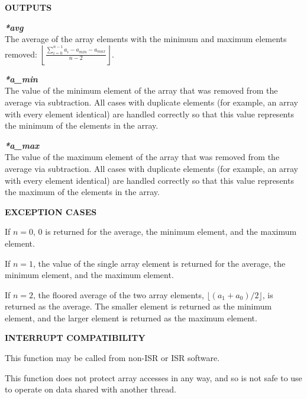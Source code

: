 \noindent\textbf{OUTPUTS}
\begin{list}{}{\setlength{\leftmargin}{0.5in}\setlength{\itemindent}{-0.25in}\setlength{\topsep}{0.0in}\setlength{\partopsep}{0.0in}}
\item \emph{\textbf{*avg}}\\
      The average of the array elements with the minimum and maximum
      elements removed:
      $\displaystyle{\left\lfloor{\frac{\sum_{i=0}^{n-1}a_i - a_{min} - a_{max}}{n-2}}\right\rfloor}$.
\item \emph{\textbf{*a\_min}}\\
      The value of the minimum element of the array that was removed from
      the average via subtraction.  All cases with duplicate elements (for example, an
      array with every element identical) are handled correctly so that this value represents the minimum
      of the elements in the array.
\item \emph{\textbf{*a\_max}}\\
      The value of the maximum element of the array that was removed from
      the average via subtraction.  All cases with duplicate elements (for example, an
      array with every element identical) are handled correctly so that this value represents the maximum
      of the elements in the array.
\end{list}
\vspace{2.8ex}

\noindent\textbf{EXCEPTION CASES}
\begin{list}{}{\setlength{\leftmargin}{0.25in}\setlength{\topsep}{0.0in}}
\item If $n = 0$, 0 is returned for the average, the minimum element, and the maximum element.
\item If $n = 1$, the value of the single array element is returned for the average, the minimum element, and
      the maximum element.
\item If $n = 2$, the floored average of the two array elements,
      $\lfloor (a_1 + a_0)/2 \rfloor$, is returned as the average.  The smaller element is
      returned as the minimum element, and the larger element is returned as the maximum element.
\end{list}
\vspace{2.8ex}

\noindent\textbf{INTERRUPT COMPATIBILITY}
\begin{list}{}{\setlength{\leftmargin}{0.25in}\setlength{\topsep}{0.0in}}
\item This function may be called from non-ISR or ISR software.
\item This function does not protect array accesses in any way, and so
      is not safe to use to operate on data shared with another thread.
\end{list}
\vspace{2.8ex}

